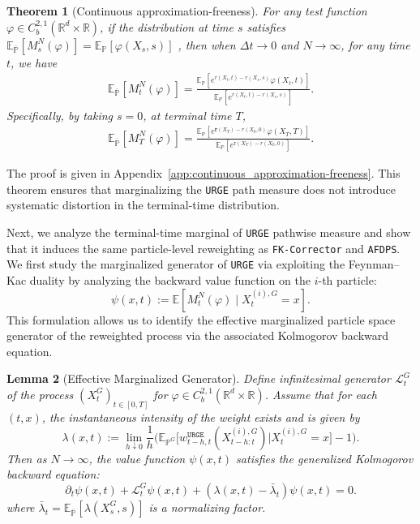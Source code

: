 \documentclass{article}
\theoremstyle{plain}
\newtheorem{theorem}{Theorem}[section]
\newtheorem{lemma}[theorem]{Lemma}
\theoremstyle{definition}
\theoremstyle{remark}
\newcommand{\E}{\mathbb{E}}
\renewcommand{\P}{{\mathbb{P}}}
\newcommand{\R}{{\mathbb{R}}}
\begin{document}
\begin{theorem}[Continuous approximation-freeness]\label{thm:continuous_approximation-freeness}
    For any test function \(\varphi\in C_b^{2,1}(\mathbb R^d\times \mathbb{R})\), if the distribution at time \(s\) satisfies $\E_{\overline{\P}}[M_s^N(\varphi)] = \E_{\P}[\varphi(X_s,s)]$ , then when \(\Delta t\rightarrow 0\) and \(N\rightarrow \infty\), for any time \(t\), we have
    \[
    \begin{aligned}
        \E_{\overline{\P}}[M_t^N(\varphi)] = \frac{\E_{\P}[e^{r(X_t,t)-r(X_s,s)} \varphi(X_t,t)]}{\E_{\P}[e^{r(X_t,t)-r(X_s,s)}]}.
    \end{aligned}
    \]
    Specifically, by taking \(s=0\), at terminal time \(T\),
    \[
    \begin{aligned}
        \E_{\overline{\P}}[M_T^N(\varphi)] = \frac{\E_{\P}[e^{\mathbf r(X_T)-r(X_0,0)} \varphi(X_T,T)]}{\E_{\P}[e^{\mathrm{r}(X_T)-r(X_0,0)}]}.
    \end{aligned}
    \]
\end{theorem}

The proof is given in Appendix~\ref{app:continuous_approximation-freeness}.
This theorem ensures that marginalizing the \texttt{URGE} path measure does not introduce systematic distortion in the terminal-time distribution. 

Next, we analyze the terminal-time marginal of \texttt{URGE} pathwise measure and show that it induces the same particle-level reweighting as \texttt{FK-Corrector} and \texttt{AFDPS}. We first study the marginalized generator of \texttt{URGE} via exploiting the Feynman--Kac duality by analyzing the backward value function on the \(i\)-th particle:
\[
    \psi(x,t) := \E\!\left[
M_t^N(\varphi)
\;\Big|\;
X_t^{(i),G}=x
\right].
\] 
This formulation allows us to identify the effective marginalized particle space generator of the reweighted process via the associated Kolmogorov backward equation.
\begin{lemma}[Effective Marginalized Generator]\label{thm:reweighted_generator}
Define infinitesimal generator $\mathcal L^G_t$ of the process $(X_t^G)_{t\in[0,T]}$ for $\varphi\in C_b^{2,1}(\R^d\times \R)$. Assume that for each $(t,x)$, the instantaneous intensity of the weight exists and is given by {\small\[\lambda(x,t) := \lim_{h \downarrow 0} \dfrac{1}{h}\Bigg(\mathbb{E}_{\mathbb{P}^G}\Big[w_{t-h,t}^{\texttt{URGE}}(X^{(i),G}_{t-h:t})\Big| X_t^{(i),G}=x \Big] - 1\Bigg).\]}
Then as \(N\rightarrow \infty\), the value function $\psi(x,t)$ satisfies the generalized Kolmogorov backward equation:
\begin{equation*}
    \partial_t \psi(x,t) + \mathcal L^G_t \psi(x,t) + (\lambda(x,t)-\bar\lambda_t)\psi(x,t) = 0.
\end{equation*}
where \(\bar\lambda_t=\E_{\overline{\P}}\!\left[\lambda(X_s^G,s)\right]\) is a normalizing factor.
\end{lemma}
\end{document}
